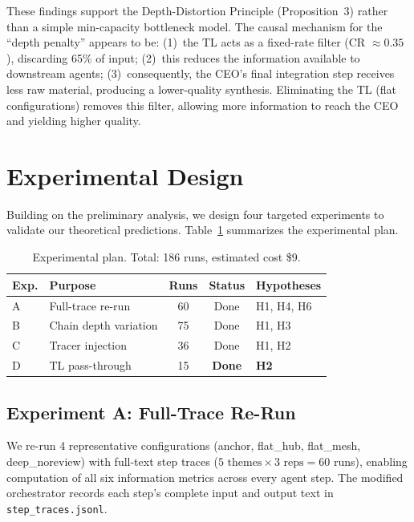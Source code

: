\documentclass[conference]{IEEEtran}
\begin{document}
These findings support the Depth-Distortion Principle (Proposition~3) rather than a simple min-capacity bottleneck model.
The causal mechanism for the ``depth penalty'' appears to be:
(1)~the TL acts as a fixed-rate filter (CR $\approx 0.35$), discarding 65\% of input;
(2)~this reduces the information available to downstream agents;
(3)~consequently, the CEO's final integration step receives less raw material, producing a lower-quality synthesis.
Eliminating the TL (flat configurations) removes this filter, allowing more information to reach the CEO and yielding higher quality.

\section{Experimental Design}
\label{sec:experiment}

Building on the preliminary analysis, we design four targeted experiments to validate our theoretical predictions.
Table~\ref{tab:experiments} summarizes the experimental plan.

\begin{table}[t]
\centering
\caption{Experimental plan. Total: 186 runs, estimated cost \$9.}
\label{tab:experiments}
\small
\begin{tabular}{llccl}
\toprule
\textbf{Exp.} & \textbf{Purpose} & \textbf{Runs} & \textbf{Status} & \textbf{Hypotheses} \\
\midrule
A & Full-trace re-run & 60 & Done & H1, H4, H6 \\
B & Chain depth variation & 75 & Done & H1, H3 \\
C & Tracer injection & 36 & Done & H1, H2 \\
D & TL pass-through & 15 & \textbf{Done} & \textbf{H2} \\
\bottomrule
\end{tabular}
\end{table}

\subsection{Experiment A: Full-Trace Re-Run}

We re-run 4 representative configurations (anchor, flat\_hub, flat\_mesh, deep\_noreview) with full-text step traces ($5 \text{ themes} \times 3 \text{ reps} = 60$ runs), enabling computation of all six information metrics across every agent step.
The modified orchestrator records each step's complete input and output text in \texttt{step\_traces.jsonl}.
\end{document}
